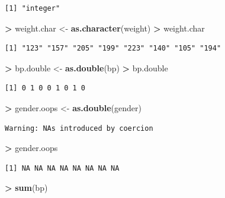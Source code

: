 \documentclass[]{krantz}
\makeatletter
\newenvironment{Shaded}{\begin{snugshade}}{\end{snugshade}}
\newcommand{\KeywordTok}[1]{\textcolor[rgb]{0.27,0.27,0.27}{\textbf{#1}}}
\newcommand{\NormalTok}[1]{#1}
\newcommand{\OperatorTok}[1]{\textcolor[rgb]{0.43,0.43,0.43}{\textbf{#1}}}
\newcommand{\StringTok}[1]{\textcolor[rgb]{0.5,0.5,0.5}{#1}}
\newenvironment{kframe}{%
\medskip{}
\setlength{\fboxsep}{.8em}
 \def\at@end@of@kframe{}%
 \ifinner\ifhmode%
  \def\at@end@of@kframe{\end{minipage}}%
  \begin{minipage}{\columnwidth}%
 \fi\fi%
 \def\FrameCommand##1{\hskip\@totalleftmargin \hskip-\fboxsep
 \colorbox{shadecolor}{##1}\hskip-\fboxsep
     \hskip-\linewidth \hskip-\@totalleftmargin \hskip\columnwidth}%
 \MakeFramed {\advance\hsize-\width
   \@totalleftmargin\z@ \linewidth\hsize
   \@setminipage}}%
 {\par\unskip\endMakeFramed%
 \at@end@of@kframe}
\renewenvironment{Shaded}{\begin{kframe}}{\end{kframe}}
\makeatother
\begin{document}
\begin{verbatim}
[1] "integer"
\end{verbatim}

\begin{Shaded}
\begin{Highlighting}[]
\OperatorTok{>}\StringTok{ }\NormalTok{weight.char <-}\StringTok{ }\KeywordTok{as.character}\NormalTok{(weight)}
\OperatorTok{>}\StringTok{ }\NormalTok{weight.char}
\end{Highlighting}
\end{Shaded}

\begin{verbatim}
[1] "123" "157" "205" "199" "223" "140" "105" "194"
\end{verbatim}

\begin{Shaded}
\begin{Highlighting}[]
\OperatorTok{>}\StringTok{ }\NormalTok{bp.double <-}\StringTok{ }\KeywordTok{as.double}\NormalTok{(bp)}
\OperatorTok{>}\StringTok{ }\NormalTok{bp.double}
\end{Highlighting}
\end{Shaded}

\begin{verbatim}
[1] 0 1 0 0 1 0 1 0
\end{verbatim}

\begin{Shaded}
\begin{Highlighting}[]
\OperatorTok{>}\StringTok{ }\NormalTok{gender.oops <-}\StringTok{ }\KeywordTok{as.double}\NormalTok{(gender)}
\end{Highlighting}
\end{Shaded}

\begin{verbatim}
Warning: NAs introduced by coercion
\end{verbatim}

\begin{Shaded}
\begin{Highlighting}[]
\OperatorTok{>}\StringTok{ }\NormalTok{gender.oops}
\end{Highlighting}
\end{Shaded}

\begin{verbatim}
[1] NA NA NA NA NA NA NA NA
\end{verbatim}

\begin{Shaded}
\begin{Highlighting}[]
\OperatorTok{>}\StringTok{ }\KeywordTok{sum}\NormalTok{(bp)}
\end{Highlighting}
\end{Shaded}
\end{document}
